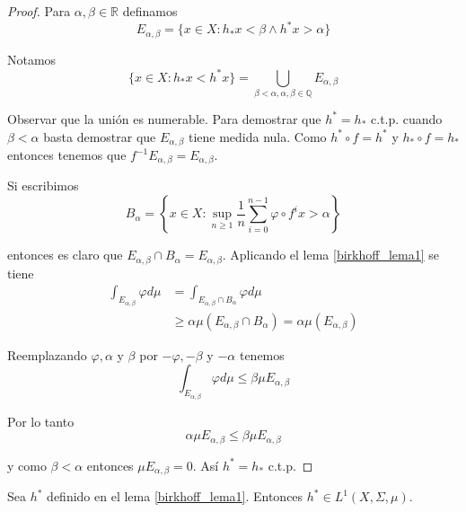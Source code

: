 \begin{proof}	
	Para $\alpha,\beta \in \mathbb{R}$ definamos
	\begin{equation}
		E_{\alpha,\beta} = \{ x \in X: h_* x < \beta \wedge h^* x > \alpha \}
	\end{equation}
	
	Notamos
	\begin{equation}
		\{x \in X: h_* x < h^* x\} = \bigcup_{\beta < \alpha, \alpha,\beta \in \mathbb{Q}} E_{\alpha,\beta}
	\end{equation}
	
	Observar que la unión es numerable. Para demostrar que $h^* = h_*$ c.t.p. cuando $\beta < \alpha$ basta demostrar que $E_{\alpha,\beta}$ tiene medida nula. Como $h^* \circ f = h^*$ y $h_* \circ f = h_*$ entonces tenemos que $f^{-1}E_{\alpha,\beta} = E_{\alpha,\beta}$. 
	
	Si escribimos 
	\begin{equation}
		B_{\alpha} = \left\{ x \in X: \sup_{n \geq 1} \frac{1}{n} \sum_{i=0}^{n-1} \varphi \circ f^i x > \alpha \right\}
	\end{equation}
	
	entonces es claro que $E_{\alpha,\beta} \cap B_{\alpha} = E_{\alpha,\beta}$. Aplicando el lema \ref{birkhoff_lema1} se tiene
	\begin{align}
		\int_{E_{\alpha,\beta}} \varphi d\mu &= \int_{E_{\alpha,\beta} \cap B_{\alpha}} \varphi d\mu\\
		&\geq \alpha \mu(E_{\alpha,\beta} \cap B_{\alpha}) = \alpha \mu(E_{\alpha,\beta})
	\end{align}
	
	Reemplazando $\varphi,\alpha$ y $\beta$ por $-\varphi,-\beta$ y $-\alpha$ tenemos
	\begin{equation}
		\int_{E_{\alpha,\beta}} \varphi d\mu \leq \beta \mu E_{\alpha,\beta}
	\end{equation}
	
	Por lo tanto
	\begin{equation}
		\alpha \mu E_{\alpha,\beta} \leq \beta \mu E_{\alpha,\beta}
	\end{equation}
	
	y como $\beta < \alpha$ entonces $\mu E_{\alpha,\beta} = 0$. Así $h^*=h_*$ c.t.p.
\end{proof}

\begin{lema}\label{birkhoff_lema2}
	Sea $h^*$  definido en el lema \ref{birkhoff_lema1}. Entonces $h^* \in L^1(X,\Sigma,\mu)$.
\end{lema}

